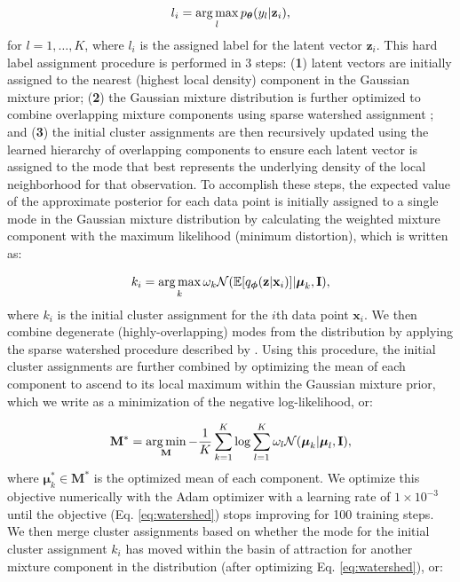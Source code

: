 \begin{equation}
    l_i = \operatorname*{arg\,max}_{l} p_{\boldsymbol{\theta}}(y_l| \mathbf{z}_i),
\end{equation}
 for $l = 1, \dots, K$, where $l_i$ is the assigned label for the latent vector $\mathbf{z}_i$. This hard label assignment procedure is performed in 3 steps: (\textbf{1}) latent vectors are initially assigned to the nearest (highest local density) component in the Gaussian mixture prior; (\textbf{2}) the Gaussian mixture distribution is further optimized to combine overlapping mixture components using sparse watershed assignment \citep{todd2017systematic}; and (\textbf{3}) the initial cluster assignments are then recursively updated using the learned hierarchy of overlapping components to ensure each latent vector is assigned to the mode that best represents the underlying density of the local neighborhood for that observation. 
 To accomplish these steps, the expected value of the approximate posterior for each data point is initially assigned to a single mode in the Gaussian mixture distribution by calculating the weighted mixture component with the maximum likelihood (minimum distortion), which is written as:

\begin{equation}
    k_i = \operatorname*{arg\,max}_{k} \omega_k \mathcal{N}(\mathbb{E}[q_{\boldsymbol{\phi}}(\mathbf{z} | 
    \mathbf{x}_i)] | \boldsymbol{\mu}_k, \mathbf{I}),
    \label{eq:initial_cluster}
\end{equation}
where $k_i$ is the initial cluster assignment for the $i$th data point $\mathbf{x}_i$. We then combine degenerate (highly-overlapping) modes from the distribution by applying the sparse watershed procedure described by \cite{todd2017systematic}. Using this procedure, the initial cluster assignments are further combined by optimizing the mean of each component to ascend to its local maximum within the Gaussian mixture prior, which we write as a minimization of the negative log-likelihood, or:

\begin{equation}
\mathbf{M^{\mathbf{*}}} = \operatorname*{arg\,min}_{\mathbf{M}} -\frac{1}{K}\sum_{k=1}^{K}\log\sum_{l=1}^{K}\omega_l \mathcal{N}(\boldsymbol{\mu}_{k} | \boldsymbol{\mu}_l, \mathbf{I}),
\label{eq:watershed}
\end{equation}
where $\boldsymbol{\mu}^{*}_k \in \mathbf{M^{*}}$ is the optimized mean of each component. We optimize this objective numerically with the Adam optimizer \citep{kingma2014adam} with a learning rate of $1\times 10^{-3}$ until the objective (Eq. \ref{eq:watershed}) stops improving for 100 training steps. We then merge cluster assignments based on whether the mode for the initial cluster assignment $k_i$ has moved within the basin of attraction for another mixture component in the distribution (after optimizing Eq. \ref{eq:watershed}), or:

